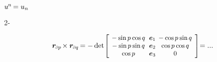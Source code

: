 ${u^{\hspace{-0.1ex}n} \hspace{-0.25ex} = u_n}$

\begin{tcolorbox}
\small\setlength{\abovedisplayskip}{2pt}\setlength{\belowdisplayskip}{2pt}

 2\hbox{-} 

\begin{equation*}
\locationvector_\differentialindex{p} \hspace{-0.25ex} \times \locationvector_\differentialindex{q} \hspace{-0.2ex}
= - \operatorname{det}\hspace{-0.2ex}
\scalebox{0.92}[0.92]{$\left[\hspace{-0.2ex}\begin{array}{c@{\hspace{.6em}}c@{\hspace{.44em}}c}
- \hspace{.1ex} \operatorname{sin} p \hspace{.1ex} \operatorname{cos} q & \bm{e}_1 & - \hspace{.1ex} \operatorname{cos} p \hspace{.1ex} \operatorname{sin} q \\
- \hspace{.1ex} \operatorname{sin} p \hspace{.1ex} \operatorname{sin} q & \bm{e}_2 & \operatorname{cos} p \hspace{.1ex} \operatorname{cos} q \\
\operatorname{cos} p & \bm{e}_3 & 0
\end{array}\hspace{-0.1ex}\right]$} \hspace{-0.5ex} = ...
\end{equation*}

\par\end{tcolorbox}
\vspace{-0.2em}


